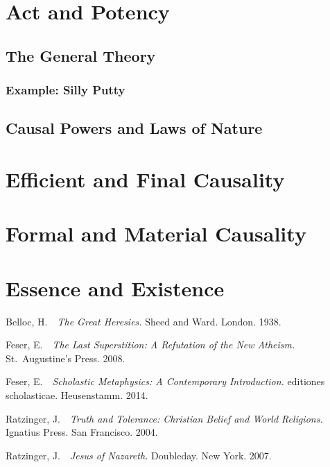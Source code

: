 \documentclass[twocolumn]{article}
\begin{document}
\section{Act and Potency}

\subsection{The General Theory}

\subsubsection{Example: Silly Putty}

\subsection{Causal Powers and Laws of Nature}

\section{Efficient and Final Causality}

\section{Formal and Material Causality}

\section{Essence and Existence}



\begin{thebibliography}{}

      Belloc, H.\ \ {\it The Great Heresies.}  Sheed and Ward.  London.  1938.

      Feser, E.\ \ {\it The Last Superstition: A Refutation of the New
      Atheism.}  St.~Augustine's Press.  2008.

      Feser, E.\ \ {\it Scholastic Metaphysics: A Contemporary Introduction.}
      editiones scholasticae. Heusenstamm.  2014.

      Ratzinger, J.\ \ {\it Truth and Tolerance: Christian Belief and World
      Religions.}  Ignatius Press.  San Francisco.  2004.

      Ratzinger, J.\ \ {\it Jesus of Nazareth.}  Doubleday.  New York.  2007.

\end{thebibliography}
\end{document}
